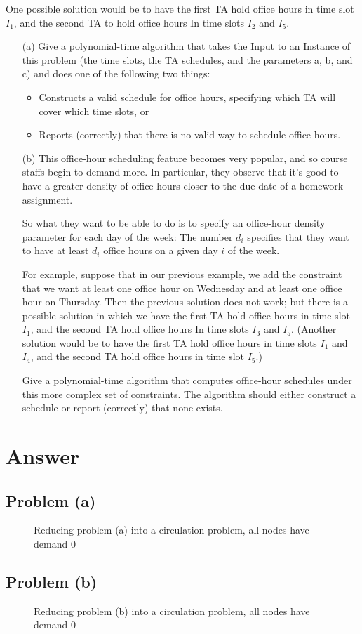 \documentclass[12pt,letterpaper]{article}
\begin{document}
One possible solution would be to have the first TA hold office hours
in time slot $I_1$, and the second TA to hold office hours In time slots $I_2$
and $I_5$.
\begin{itemize}
\item[(a)] Give a polynomial-time algorithm that takes the Input to an Instance
of this problem (the time slots, the TA schedules, and the parameters
a, b, and c) and does one of the following two things:
\begin{itemize}
\item Constructs a valid schedule for office hours, specifying which
TA will cover which time slots, or
\item Reports (correctly) that there is no valid way to schedule office
hours.
\end{itemize}
\item[(b)] This office-hour scheduling feature becomes very popular, and so
course staffs begin to demand more. In particular, they observe that
it's good to have a greater density of office hours closer to the due
date of a homework assignment.

So what they want to be able to do is to specify an office-hour
density parameter for each day of the week: The number $d_i$ specifies
that they want to have at least $d_i$ office hours on a given day $i$ of the
week.

For example, suppose that in our previous example, we add the
constraint that we want at least one office hour on Wednesday and at
least one office hour on Thursday. Then the previous solution does
not work; but there is a possible solution in which we have the first
TA hold office hours in time slot $I_1$, and the second TA hold office
hours In time slots $I_3$ and $I_5$. (Another solution would be to have the
first TA hold office hours in time slots $I_1$ and $I_4$, and the second TA
hold office hours in time slot $I_5$.)

Give a polynomial-time algorithm that computes office-hour
schedules under this more complex set of constraints. The algorithm
should either construct a schedule or report (correctly) that
none exists.
\end{itemize}

\section*{Answer}
\subsection*{Problem (a)}
\begin{figure}
\begin{center}
\caption{Reducing problem (a) into a circulation problem, all nodes have demand 0}
\end{center}
\end{figure}

\subsection*{Problem (b)}
\begin{figure}
\begin{center}
\caption{Reducing problem (b) into a circulation problem, all nodes have demand 0}
\end{center}
\end{figure}
\end{document}
